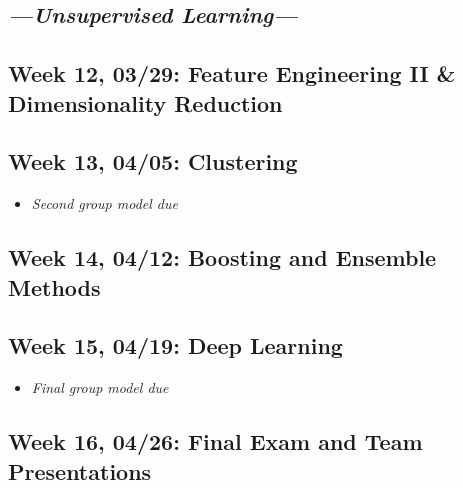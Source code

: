 \documentclass[11pt,]{article}
\providecommand{\tightlist}{%
  \setlength{\itemsep}{0pt}\setlength{\parskip}{0pt}}
\begin{document}
\hypertarget{section-1}{%
\subsection{\texorpdfstring{\emph{\textcolor{OliveGreen}{---Unsupervised Learning---}}}{}}\label{section-1}}

\hypertarget{week-12-0329-feature-engineering-ii-dimensionality-reduction}{%
\subsection{Week 12, 03/29: Feature Engineering II \& Dimensionality
Reduction}\label{week-12-0329-feature-engineering-ii-dimensionality-reduction}}

\hypertarget{week-13-0405-clustering}{%
\subsection{Week 13, 04/05: Clustering}\label{week-13-0405-clustering}}

\begin{itemize}
\tightlist
\item
  \emph{\textcolor{Bittersweet}{Second group model due}}
\end{itemize}

\hypertarget{week-14-0412-boosting-and-ensemble-methods}{%
\subsection{Week 14, 04/12: Boosting and Ensemble
Methods}\label{week-14-0412-boosting-and-ensemble-methods}}

\hypertarget{week-15-0419-deep-learning}{%
\subsection{Week 15, 04/19: Deep
Learning}\label{week-15-0419-deep-learning}}

\begin{itemize}
\tightlist
\item
  \emph{\textcolor{Bittersweet}{Final group model due}}
\end{itemize}

\hypertarget{week-16-0426-final-exam-and-team-presentations}{%
\subsection{Week 16, 04/26: Final Exam and Team
Presentations}\label{week-16-0426-final-exam-and-team-presentations}}
\end{document}
